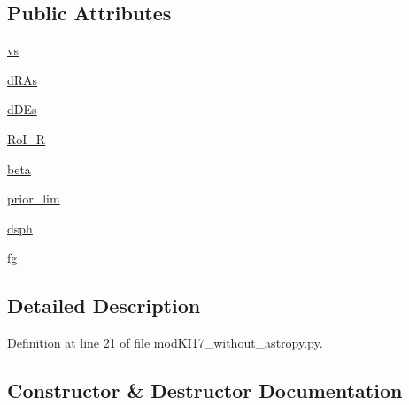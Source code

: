 \subsection*{Public Attributes}
\begin{DoxyCompactItemize}
\item 
\hyperlink{classmodKI17__without__astropy_1_1modKI17_a8a56150fe457d8eb85ff2f79d3b484cc}{vs}
\item 
\hyperlink{classmodKI17__without__astropy_1_1modKI17_a9c59e743c78ddd91d8b1ae847cea17eb}{d\+R\+As}
\item 
\hyperlink{classmodKI17__without__astropy_1_1modKI17_adf06e4bd1ebee33ba8328dfe29ff0903}{d\+D\+Es}
\item 
\hyperlink{classmodKI17__without__astropy_1_1modKI17_a704380374cd5fb54dc7be59fa741b6a5}{Ro\+I\+\_\+R}
\item 
\hyperlink{classmodKI17__without__astropy_1_1modKI17_a60e9915864f482b4fab62e671319cd2e}{beta}
\item 
\hyperlink{classmodKI17__without__astropy_1_1modKI17_a91d0712b48f0cebc36ac2ad7221e0457}{prior\+\_\+lim}
\item 
\hyperlink{classmodKI17__without__astropy_1_1modKI17_ac5ce021cd8c260097c4626724517a319}{dsph}
\item 
\hyperlink{classmodKI17__without__astropy_1_1modKI17_af417f3abf8edeba20ecb5f83f7ba8bcc}{fg}
\end{DoxyCompactItemize}


\subsection{Detailed Description}


Definition at line 21 of file mod\+K\+I17\+\_\+without\+\_\+astropy.\+py.



\subsection{Constructor \& Destructor Documentation}
\mbox{\label{classmodKI17__without__astropy_1_1modKI17_a89acb6a530ce5cc12d1635b19e744494}} 
